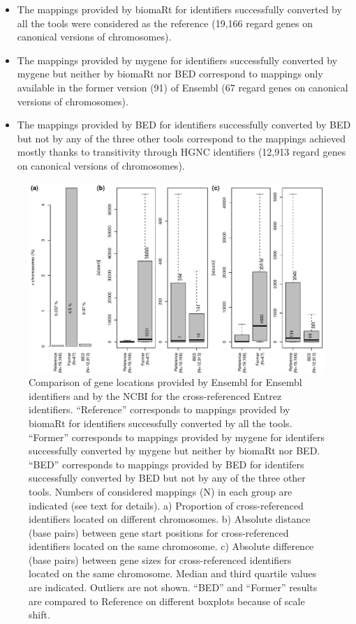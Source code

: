 \documentclass[9pt,a4paper,]{extarticle}
\theoremstyle{definition}
\theoremstyle{definition}
\theoremstyle{definition}
\theoremstyle{remark}
\begin{document}
\begin{itemize}
\item
  The mappings provided by biomaRt for identifiers successfully converted
  by all the tools were considered as the reference
  (19,166 regard genes on canonical versions
  of chromosomes).
\item
  The mappings provided by mygene for identifiers
  successfully converted by mygene but neither by biomaRt nor BED
  correspond to mappings only available in the former version (91) of Ensembl
  (67 regard genes on canonical versions
  of chromosomes).
\item
  The mappings provided by BED for identifiers
  successfully converted by BED but not by any of the three other tools
  correspond to the mappings achieved mostly thanks
  to transitivity through HGNC identifiers
  (12,913 regard genes on canonical versions
  of chromosomes).
\end{itemize}

\begin{figure}

{\centering \includegraphics[width=1\linewidth]{BED-F1000-Article_files/figure-latex/geneLocations-1} 

}

\caption{Comparison of gene locations provided by Ensembl for Ensembl identifiers and by the NCBI for the cross-referenced Entrez identifiers. ``Reference'' corresponds to mappings provided by biomaRt for identifiers successfully converted by all the tools. ``Former'' corresponds to mappings provided by mygene for identifers successfully converted by mygene but neither by biomaRt nor BED. ``BED'' corresponds to mappings provided by BED for identifers successfully converted by BED but not by any of the three other tools. Numbers of considered mappings (N) in each group are indicated (see text for details). a) Proportion of cross-referenced identifiers located on different chromosomes. b) Absolute distance (base pairs) between gene start positions for cross-referenced identifiers located on the same chromosome. c) Absolute difference (base pairs) between gene sizes for cross-referenced identifiers located on the same chromosome. Median and third quartile values are indicated. Outliers are not shown. ``BED'' and ``Former'' results are compared to Reference on different boxplots because of scale shift.}\label{fig:geneLocations}
\end{figure}
\end{document}

